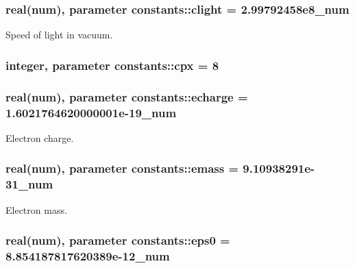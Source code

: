 \subsubsection[{\texorpdfstring{clight}{clight}}]{\setlength{\rightskip}{0pt plus 5cm}real({\bf num}), parameter constants\+::clight = 2.\+99792458e8\+\_\+num}\hypertarget{namespaceconstants_ac23d8857383002cada2aa571fd859533}{}\label{namespaceconstants_ac23d8857383002cada2aa571fd859533}


Speed of light in vacuum. 

\subsubsection[{\texorpdfstring{cpx}{cpx}}]{\setlength{\rightskip}{0pt plus 5cm}integer, parameter constants\+::cpx = 8}\hypertarget{namespaceconstants_a5709f0ae2ee52b1906446ad25ed0f587}{}\label{namespaceconstants_a5709f0ae2ee52b1906446ad25ed0f587}
\subsubsection[{\texorpdfstring{echarge}{echarge}}]{\setlength{\rightskip}{0pt plus 5cm}real({\bf num}), parameter constants\+::echarge = 1.\+6021764620000001e-\/19\+\_\+num}\hypertarget{namespaceconstants_af0f1098f6be55eab4174890ed5caaf98}{}\label{namespaceconstants_af0f1098f6be55eab4174890ed5caaf98}


Electron charge. 

\subsubsection[{\texorpdfstring{emass}{emass}}]{\setlength{\rightskip}{0pt plus 5cm}real({\bf num}), parameter constants\+::emass = 9.\+10938291e-\/31\+\_\+num}\hypertarget{namespaceconstants_ad39536f583f0861abb2fb19a27c56fc8}{}\label{namespaceconstants_ad39536f583f0861abb2fb19a27c56fc8}


Electron mass. 

\subsubsection[{\texorpdfstring{eps0}{eps0}}]{\setlength{\rightskip}{0pt plus 5cm}real({\bf num}), parameter constants\+::eps0 = 8.\+854187817620389e-\/12\+\_\+num}\hypertarget{namespaceconstants_a4fc609b4d7bd5d8e45e57bd0ba7c5e29}{}\label{namespaceconstants_a4fc609b4d7bd5d8e45e57bd0ba7c5e29}


